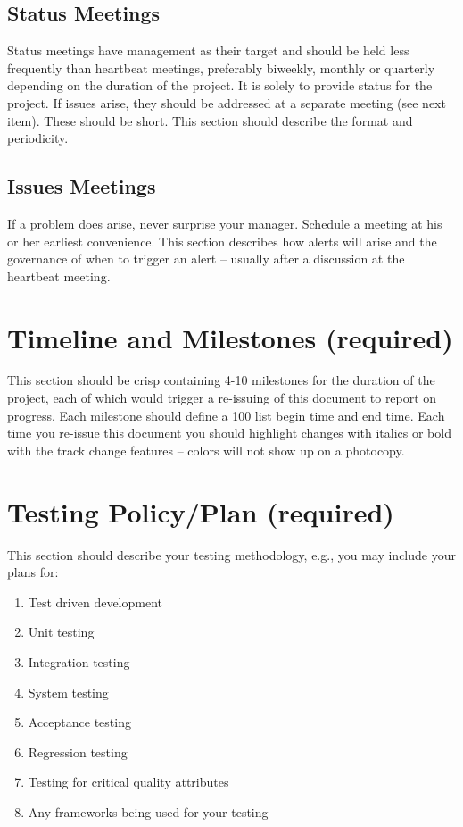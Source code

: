\subsection{Status Meetings}
Status meetings have management as their target and should be held less frequently than 
heartbeat meetings, preferably biweekly, monthly or quarterly depending on the duration 
of the project.  It is solely to provide status for the project.  If issues arise, they should be 
addressed at a separate meeting (see next item). These should be short.  This section 
should describe the format and periodicity.

\subsection{Issues Meetings}
If a problem does arise, never surprise your manager.  Schedule a meeting at his or her 
earliest convenience.  This section describes how alerts will arise and the governance of 
when to trigger an alert – usually after a discussion at the heartbeat meeting.

\section{Timeline and Milestones (required)}

This section should be crisp containing 4-10 milestones for the duration of the project, 
each of which would trigger a re-issuing of this document to report on progress.  Each 
milestone should define a 100%
list begin time and end time.  Each time you re-issue this document you should highlight 
changes with italics or bold with the track change features – colors will not show up on a photocopy.

\section{Testing Policy/Plan (required)}
This section should describe your testing methodology, e.g., you may include your plans for:
\begin{enumerate}
\item	Test driven development
\item	Unit testing
\item	Integration testing 
\item	System testing 
\item	Acceptance testing 
\item	Regression testing
\item	Testing for critical quality attributes
\item	Any frameworks being used for your testing
\end{enumerate}

